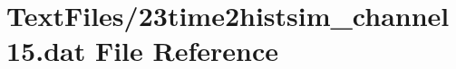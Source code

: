 \hypertarget{23time2histsim__channel15_8dat}{}\section{Text\+Files/23time2histsim\+\_\+channel15.dat File Reference}
\label{23time2histsim__channel15_8dat}
